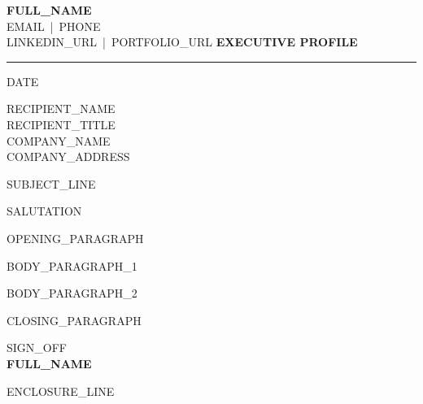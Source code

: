 \documentclass[a4paper,11pt]{article}
\begin{document}
\textbf{{{FULL_NAME}}}\\
{{EMAIL}} \,|\, {{PHONE}}\\
{{LINKEDIN_URL}} \,|\, {{PORTFOLIO_URL}}
\hfill
\textbf{EXECUTIVE PROFILE}
\rule{\textwidth}{0.8pt}

\vspace{1em}
{{DATE}}

\vspace{1em}
{{RECIPIENT_NAME}}\\
{{RECIPIENT_TITLE}}\\
{{COMPANY_NAME}}\\
{{COMPANY_ADDRESS}}

\vspace{1em}
{{SUBJECT_LINE}}

\vspace{1em}
{{SALUTATION}}

{{OPENING_PARAGRAPH}}

{{BODY_PARAGRAPH_1}}

{{BODY_PARAGRAPH_2}}

{{CLOSING_PARAGRAPH}}

\vspace{1.5em}
{{SIGN_OFF}}\\[2em]
\textbf{{{FULL_NAME}}}

\vspace{2em}
{{ENCLOSURE_LINE}}
\end{document}
